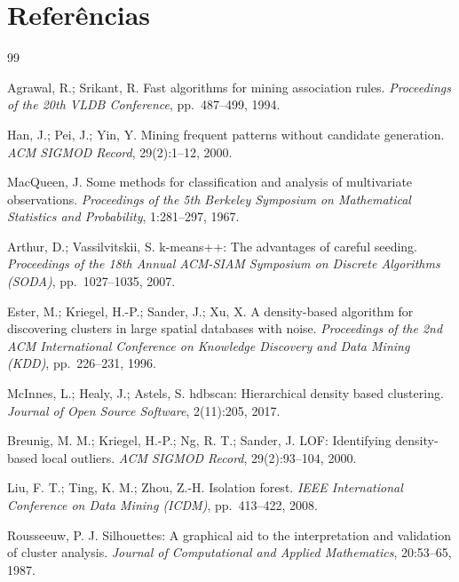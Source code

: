 \documentclass[12pt,a4paper]{article}
\begin{document}
\section{Referências}

\begin{thebibliography}{99}

Agrawal, R.; Srikant, R.
\newblock Fast algorithms for mining association rules.
\newblock \textit{Proceedings of the 20th VLDB Conference}, pp.~487--499, 1994.

Han, J.; Pei, J.; Yin, Y.
\newblock Mining frequent patterns without candidate generation.
\newblock \textit{ACM SIGMOD Record}, 29(2):1--12, 2000.

MacQueen, J.
\newblock Some methods for classification and analysis of multivariate observations.
\newblock \textit{Proceedings of the 5th Berkeley Symposium on Mathematical Statistics and Probability}, 1:281--297, 1967.

Arthur, D.; Vassilvitskii, S.
\newblock k-means++: The advantages of careful seeding.
\newblock \textit{Proceedings of the 18th Annual ACM-SIAM Symposium on Discrete Algorithms (SODA)}, pp.~1027--1035, 2007.

Ester, M.; Kriegel, H.-P.; Sander, J.; Xu, X.
\newblock A density-based algorithm for discovering clusters in large spatial databases with noise.
\newblock \textit{Proceedings of the 2nd ACM International Conference on Knowledge Discovery and Data Mining (KDD)}, pp.~226--231, 1996.

McInnes, L.; Healy, J.; Astels, S.
\newblock hdbscan: Hierarchical density based clustering.
\newblock \textit{Journal of Open Source Software}, 2(11):205, 2017.

Breunig, M. M.; Kriegel, H.-P.; Ng, R. T.; Sander, J.
\newblock LOF: Identifying density-based local outliers.
\newblock \textit{ACM SIGMOD Record}, 29(2):93--104, 2000.

Liu, F. T.; Ting, K. M.; Zhou, Z.-H.
\newblock Isolation forest.
\newblock \textit{IEEE International Conference on Data Mining (ICDM)}, pp.~413--422, 2008.

Rousseeuw, P. J.
\newblock Silhouettes: A graphical aid to the interpretation and validation of cluster analysis.
\newblock \textit{Journal of Computational and Applied Mathematics}, 20:53--65, 1987.


\end{thebibliography}
\end{document}
